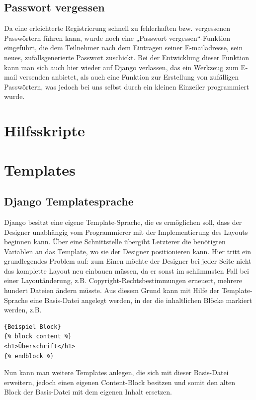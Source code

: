 \documentclass[titlepage, 12pt,a4paper]{scrartcl}
\begin{document}
\subsection{Passwort vergessen}
Da eine erleichterte Registrierung schnell zu fehlerhaften bzw. vergessenen 
Passwörtern führen kann, wurde noch eine „Passwort vergessen“-Funktion 
eingeführt, die dem Teilnehmer nach dem Eintragen seiner E-mailadresse, sein 
neues, zufallsgenerierte Passwort zuschickt. Bei der Entwicklung dieser
Funktion  kann man sich auch hier wieder auf Django verlassen, das ein Werkzeug
zum E-mail versenden anbietet, als auch eine Funktion zur Erstellung von 
zufälligen Passwörtern, was jedoch bei uns selbst durch ein kleinen Einzeiler 
programmiert wurde.

\section{Hilfsskripte}\label{hilfsskripte}

\section{Templates}
\subsection{Django Templatesprache}
Django besitzt eine eigene Template-Sprache, die es ermöglichen soll, dass der 
Designer unabhängig vom Programmierer mit der Implementierung des Layouts 
beginnen kann. Über eine Schnittstelle übergibt Letzterer die benötigten 
Variablen an das Template, wo sie der Designer positionieren kann. Hier tritt 
ein grundlegendes Problem auf: zum Einen möchte der Designer bei jeder Seite 
nicht das komplette Layout neu einbauen müssen, da er sonst im schlimmsten Fall
bei einer Layoutänderung, z.B. Copyright-Rechtsbestimmungen erneuert, mehrere 
hundert Dateien ändern müsste. Aus diesem Grund kann mit Hilfe der 
Template-Sprache eine Basis-Datei angelegt werden, in der die inhaltlichen 
Blöcke markiert werden, z.B.

\begin{lstlisting}[caption=Beispiel]{Beispiel Block}
{% block content %}
<h1>Überschrift</h1>
{% endblock %}
\end{lstlisting}
 
Nun kann man weitere Templates anlegen, die sich mit dieser Basis-Datei 
erweitern, jedoch einen eigenen Content-Block besitzen und somit den alten
Block  der Basis-Datei mit dem eigenen Inhalt ersetzen.
\end{document}
